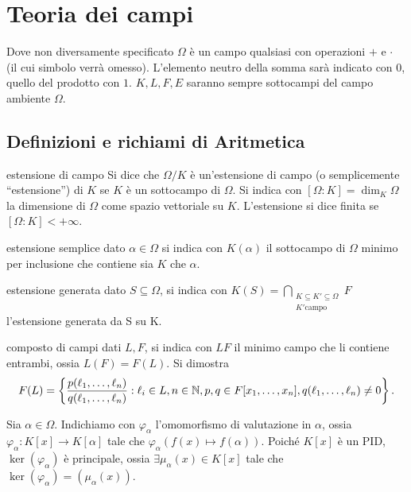 \section{Teoria dei campi}
Dove non diversamente specificato $\Omega$ è un campo qualsiasi con operazioni $+$ e $\cdot$ (il cui simbolo verrà omesso). L'elemento neutro della somma sarà indicato con $0$, quello del prodotto con $1$. $K,L,F,E$ saranno sempre sottocampi del campo ambiente $\Omega$. 

\subsection{Definizioni e richiami di Aritmetica}
\begin{definition}{estensione di campo}
    Si dice che $\Omega/K$ è un'estensione di campo (o semplicemente ``estensione'') di $K$ se $K$ è un sottocampo di $\Omega$. Si indica con $[\Omega : K] = \dim_K \Omega$ la dimensione di $\Omega$ come spazio vettoriale su $K$. L'estensione si dice finita se $[\Omega : K] < +\infty$.
\end{definition}
\begin{definition}{estensione semplice}
    dato $\alpha \in \Omega$ si indica con $K(\alpha)$ il sottocampo di $\Omega$ minimo per inclusione che contiene sia $K$ che $\alpha$.
\end{definition}
\begin{definition}{estensione generata}
    dato $S\subseteq \Omega$, si indica con $K(S) = \bigcap_{\substack{K \subseteq K' \subseteq \Omega \\ K' \text{campo}}} F$ l'estensione generata da S su K.
\end{definition}
\begin{definition}{composto di campi}
    dati $L,F$, si indica con $LF$ il minimo campo che li contiene entrambi, ossia $L(F) = F(L)$. Si dimostra
    \[
        F(L) = \left\{ \frac{p(\ell_1, \dots, \ell_n)}{q(\ell_1, \dots, \ell_n)} : \ell_i \in L, n \in \mathbb{N}, p,q \in F[x_1, \dots, x_n], q(\ell_1, \dots, \ell_n) \neq 0 \right\}.
    \]
\end{definition}

\begin{minipage}{0.7\textwidth}
    Sia $\alpha \in \Omega$. Indichiamo con $\varphi_{\alpha}$ l'omomorfismo di valutazione in $\alpha$, ossia $\varphi_{\alpha}: K[x] \rightarrow K[\alpha]$ tale che $\varphi_{\alpha}(f(x) \mapsto f(\alpha))$. Poiché $K[x]$ è un PID, $\ker(\varphi_\alpha)$ è principale, ossia $\exists \mu_{\alpha}(x) \in K[x]$ tale che $\ker(\varphi_\alpha) = (\mu_\alpha(x))$.
\end{minipage}\hfill
\begin{minipage}{0.3\textwidth}  
    \begin{center}
    \end{center}
\end{minipage}\hfill

